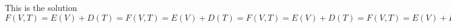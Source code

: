 \documentclass[10pt,crop,varwidth]{standalone}
\begin{document}
This is the solution $F(V, T) = E(V) + D(T) = F(V, T) = E(V) + D(T) = F(V, T) = E(V) + D(T) = F(V, T) = E(V) + D(T)$
\end{document}
